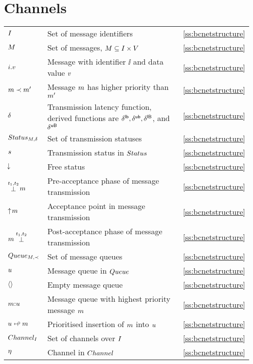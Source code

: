 {\section*{Channels}
\begin{tabular}{l>{\raggedright}p{.4\linewidth}<{}l}
$\I$ & Set of message identifiers & \ref{ss:bcnetstructure} \\
$\M$ & Set of messages, $\M \subseteq \I \cross \V$ & \ref{ss:bcnetstructure} \\
$\ii.\vv$ & Message with identifier $\ii$ and data value $\vv$ & \ref{ss:bcnetstructure} \\
$\mm \pless \mm'$ & Message $\mm$ has higher priority than $\mm'$ & \ref{ss:bcnetstructure} \\
$\latency$ & Transmission latency function, derived functions are $\dlb,\dub,\dlB$, and $\duB$ & \ref{ss:bcnetstructure} \\
$\Status{\M,\latency}$ & Set of transmission statuses & \ref{ss:bcnetstructure} \\
$\ss$ & Transmission status in $\Status{}$  & \ref{ss:bcnetstructure} \\
$\free$ & Free status & \ref{ss:bcnetstructure} \\
${}\preact{\ti_1,\ti_2}{\mm}$ & Pre-acceptance phase of message transmission & \ref{ss:bcnetstructure} \\ 
${}\offers{\mm}$ & Acceptance point in message transmission & \ref{ss:bcnetstructure} \\
${}\postact{\ti_1,\ti_2}{\mm}$ & Post-acceptance phase of message transmission  & \ref{ss:bcnetstructure} \\ 
$\Queue{\M,\pless}$ & Set of message queues  & \ref{ss:bcnetstructure} \\
$\mq$ & Message queue in $\Queue{}$ & \ref{ss:bcnetstructure} \\
$\emq$ & Empty message queue & \ref{ss:bcnetstructure} \\
$\mm \cq \mq$ & Message queue with highest priority message $\mm$ & \ref{ss:bcnetstructure} \\ 
$\mq \iq \mm$ & Prioritised insertion of $\mm$ into $\mq$ & \ref{ss:bcnetstructure} \\
$\Channel{\I}$ & Set of channels over $\I$ & \ref{ss:bcnetstructure} \\
$\channel$ & Channel in $\Channel{}$ & \ref{ss:bcnetstructure} \\
\end{tabular}
\vfil

}
